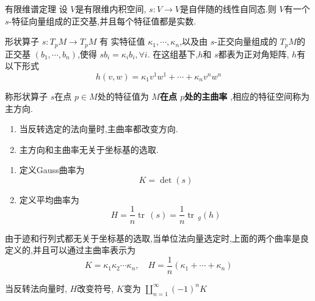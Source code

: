\documentclass[../../几何与拓扑.tex]{subfiles}
\begin{document}
\begin{proposition}{有限维谱定理}
    设 \(  V  \)是有限维内积空间, \(  s:V\to V  \)是自伴随的线性自同态.则 \(  V  \)有一个 \(  s  \)-特征向量组成的正交基,并且每个特征值都是实数.    
\end{proposition}

\begin{proposition}
    形状算子 \(  s:T_{p}M\to T_{p}M  \) 有 实特征值 \(   \kappa_1,\cdots,\kappa_n   \),以及由 \(  s  \)-正交向量组成的 \(  T_{p}M  \)的正交基 \(  \left(  b_1,\cdots,b_n \right)   \),使得 \(  sb_{i}=  \kappa _i b_{i} ,\forall i \).   在这组基下,\(  h  \)和 \(  s  \)都表为正对角矩阵, \(  h  \)有以下形式\[
        h\left( v,w \right)=  \kappa _1 v^{1}w^{1}+ \cdots +  \kappa _n v^{n}w^{n} 
        \]     
\end{proposition}

\begin{definition}
    称形状算子 \(  s  \)在点 \(  p \in M  \)处的特征值为 \textbf{\(  M  \)在点 \(  p  \)处的主曲率  },相应的特征空间称为主方向.  
\end{definition}
\begin{remark}
    \begin{enumerate}
        \item 当反转选定的法向量时,主曲率都改变方向.
        \item 主方向和主曲率无关于坐标基的选取.
    \end{enumerate}
    
\end{remark}

\begin{definition}
    \begin{enumerate}
        \item 定义Gauss曲率为 \[
        K= \det \left( s \right) 
        \]
        \item 定义平均曲率为 \[
        H =   \frac{1}{n} \operatorname{tr}\,\left( s \right)= \frac{1}{n} \operatorname{tr}\,_{g}\left( h \right)  
        \]
    \end{enumerate}
    由于迹和行列式都无关于坐标基的选取,当单位法向量选定时,上面的两个曲率是良定义的,并且可以通过主曲率表示为 \[
    K=  \kappa _1  \kappa _2 \cdots  \kappa _{n},\quad H= \frac{1}{n} \left(  \kappa _1 + \cdots +  \kappa _{n} \right) 
    \]
\end{definition}

\begin{remark}
    当反转法向量时, \(  H  \)改变符号, \(  K  \)变为 \(  \coprod_{n=1}^{\infty} \left( -1 \right)^{n}K   \)   
\end{remark}
\end{document}
